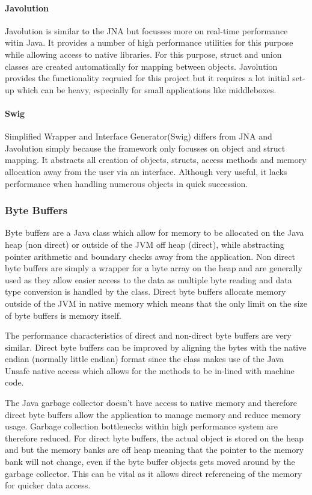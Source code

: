 \documentclass[final_report.tex]{subfiles}
\begin{document}
\paragraph*{Javolution}
Javolution is similar to the JNA but focusses more on real-time performance witin Java. It provides a number of high performance utilities for this purpose while allowing access to native libraries. For this purpose, struct and union classes are created automatically for mapping between objects. Javolution provides the functionality reqruied for this project but it requires a lot initial set-up which can be heavy, especially for small applications like middleboxes.

\paragraph*{Swig}
Simplified Wrapper and Interface Generator(Swig) differs from JNA and Javolution simply because the framework only focusses on object and struct mapping. It abstracts all creation of objects, structs, access methods and memory allocation away from the user via an interface. Although very useful, it lacks performance when handling numerous objects in quick succession. 

\subsubsection{Byte Buffers}
Byte buffers are a Java class which allow for memory to be allocated on the Java heap (non direct) or outside of the JVM off heap (direct), while abstracting pointer arithmetic and boundary checks away from the application. Non direct byte buffers are simply a wrapper for a byte array on the heap and are generally used as they allow easier access to the data as multiple byte reading and data type conversion is handled by the class. Direct byte buffers allocate memory outside of the JVM in native memory which means that the only limit on the size of byte buffers is memory itself.

The performance characteristics of direct and non-direct byte buffers are very similar. Direct byte buffers can be improved by aligning the bytes with the native endian (normally little endian) format since the class makes use of the Java Unsafe native access which allows for the methods to be in-lined with machine code.

The Java garbage collector doesn't have access to native memory and therefore direct byte buffers allow the application to manage memory and reduce memory usage. Garbage collection bottlenecks within high performance system are therefore reduced. For direct byte buffers, the actual object is stored on the heap and but the memory banks are off heap meaning that the pointer to the memory bank will not change, even if the byte buffer objects gets moved around by the garbage collector. This can be vital as it allows direct referencing of the memory for quicker data access.
\end{document}

